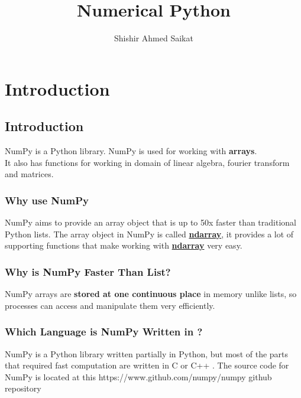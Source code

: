 \documentclass[openany]{book}
\title{Numerical Python}
\author{Shishir Ahmed Saikat}
\begin{document}
\frontmatter %

\maketitle{}
\tableofcontents

\mainmatter %


\chapter{Introduction}
\section{Introduction}
NumPy is a Python library.
NumPy is used for working with \textbf{arrays}. \\
It also has functions for working in domain of linear algebra, fourier transform and matrices.\\


\subsection{Why use NumPy}
NumPy aims to provide an array object that is up to 50x faster than traditional Python lists. The array object in NumPy is called \textbf{\underline{ndarray}}, it provides a lot of supporting functions that make working with \textbf{\underline{ndarray}} very easy. 

\subsection{Why is NumPy Faster Than List?}

NumPy arrays are \textbf{stored at one continuous place} in memory unlike lists, so processes can access and manipulate them very efficiently.

\subsection{Which Language is NumPy Written in ?}

NumPy is a Python library written partially in Python, but most of the parts that required fast computation are written in C or C++ . The source code for NumPy is located at this {https://www.github.com/numpy/numpy} github repository
\end{document}
